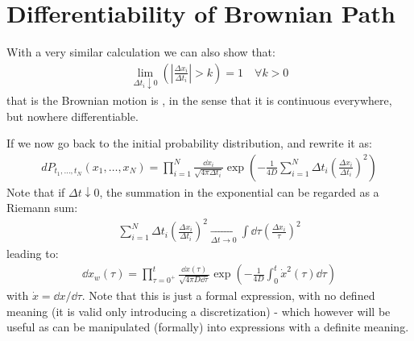 \documentclass[../template.tex]{subfiles}
\begin{document}
\section{Differentiability of Brownian Path}
With a very similar calculation we can also show that:
\begin{align*}
    \lim_{\Delta t_i \downarrow 0} \left( \left|\frac{\Delta x_i}{\Delta t_i}\right| > k \right) = 1 \quad \forall k > 0
\end{align*}
that is the Brownian motion is , in the sense that it is continuous everywhere, but nowhere differentiable.


If we now go back to the initial probability distribution, and rewrite it as:
\begin{align*}
    dP_{t_1, \dots, t_N} (x_1, \dots, x_N) = \prod_{i=1}^N \frac{\dd{x_i}}{\sqrt{4 \pi \Delta t_i }}\exp\left(-\frac{1}{4 D} \sum_{i=1}^N \Delta t_i \left(\frac{\Delta x_i}{\Delta t_i} \right)^2 \right) 
\end{align*}
Note that if $\Delta t \downarrow 0$, the summation in the exponential can be regarded as a Riemann sum:
\begin{align*}
    \sum_{i=1}^N \Delta t_i \left(\frac{\Delta x_i}{\Delta t_i} \right)^2 \xrightarrow[\Delta t \to 0]{} \int \dd{\tau} \left(\frac{\Delta x_i}{\tau} \right)^2
\end{align*} 
leading to:
\begin{align*}
    \dd{x_w}(\tau) = \prod_{\tau = 0^+}^t \frac{\dd{x}(\tau)}{\sqrt{4 \pi D \dd{\tau}}} \exp\left(-\frac{1}{4 D} \int_0^t \dot{x}^2 (\tau) \dd{\tau} \right) 
\end{align*}
with $\dot{x} = \dd{x}/\dd{\tau}$. Note that this is just a formal expression, with no defined meaning (it is valid only introducing a discretization) - which however will be useful as can be manipulated (formally) into expressions with a definite meaning.
\end{document}
